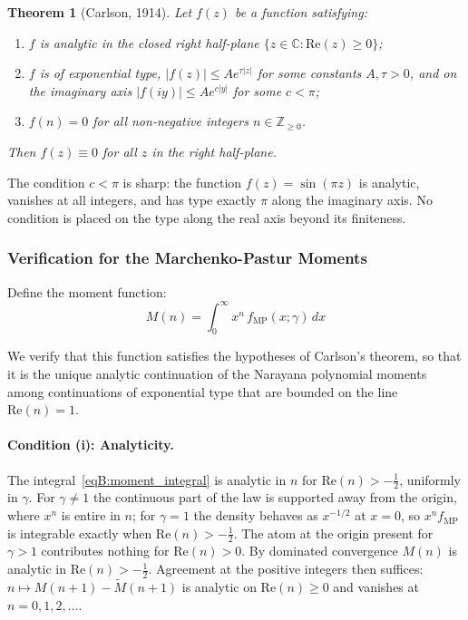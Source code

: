 \documentclass[11pt,letterpaper]{article}
\theoremstyle{plain}
\newtheorem{theorem}{Theorem}[section]
\theoremstyle{definition}
\theoremstyle{remark}
\begin{document}
\begin{theorem}[Carlson, 1914]
\label{thmB:carlson}
Let $f(z)$ be a function satisfying:
\begin{enumerate}
\item[(i)] $f$ is analytic in the closed right half-plane $\{z \in \mathbb{C} : \mathrm{Re}(z) \geq 0\}$;
\item[(ii)] $f$ is of exponential type, $|f(z)| \leq A e^{\tau|z|}$ for some constants $A, \tau > 0$, and on the imaginary axis $|f(iy)| \leq A e^{c|y|}$ for some $c < \pi$;
\item[(iii)] $f(n) = 0$ for all non-negative integers $n \in \mathbb{Z}_{\geq 0}$.
\end{enumerate}
Then $f(z) \equiv 0$ for all $z$ in the right half-plane.
\end{theorem}

The condition $c < \pi$ is sharp: the function $f(z) = \sin(\pi z)$ is analytic, vanishes at all integers, and has type exactly $\pi$ along the imaginary axis. No condition is placed on the type along the real axis beyond its finiteness.

\subsubsection*{Verification for the Marchenko-Pastur Moments}

Define the moment function:
\begin{equation}
M(n) = \int_0^{\infty} x^n \, f_{\mathrm{MP}}(x; \gamma) \, dx
\label{eqB:moment_integral}
\end{equation}

We verify that this function satisfies the hypotheses of Carlson's theorem, so that it is the unique analytic continuation of the Narayana polynomial moments among continuations of exponential type that are bounded on the line $\mathrm{Re}(n) = 1$.


\paragraph{Condition (i): Analyticity.}

The integral~\eqref{eqB:moment_integral} is analytic in $n$ for $\mathrm{Re}(n) > -\tfrac12$, uniformly in $\gamma$. For $\gamma \neq 1$ the continuous part of the law is supported away from the origin, where $x^n$ is entire in $n$; for $\gamma = 1$ the density behaves as $x^{-1/2}$ at $x = 0$, so $x^n f_{\mathrm{MP}}$ is integrable exactly when $\mathrm{Re}(n) > -\tfrac12$. The atom at the origin present for $\gamma > 1$ contributes nothing for $\mathrm{Re}(n) > 0$. By dominated convergence $M(n)$ is analytic in $\mathrm{Re}(n) > -\tfrac12$. Agreement at the positive integers then suffices: $n \mapsto M(n+1) - \tilde M(n+1)$ is analytic on $\mathrm{Re}(n) \ge 0$ and vanishes at $n = 0, 1, 2, \ldots$.
\end{document}
